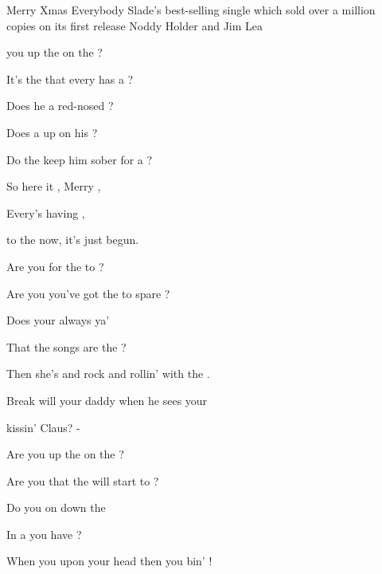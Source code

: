 \begin{SBSong}{Merry Xmas Everybody}
    {Slade's best-selling single which sold over a million copies on its first release}
    {Noddy Holder and Jim Lea}
  \begin{SBVerse}
	 you  up the  on the ?  
	
	It's the  that every  has a ?  
	
	Does he  a red-nosed ?
	
	Does a  up on his ?
	
	Do the  keep him sober for a ?  
  \end{SBVerse}
  
  \begin{SBChorus}
	So here it , Merry ,
	
	Every's having ,
	
	 to the  now, it's  just begun.   
  \end{SBChorus}
  \begin{SBVerse}
	Are you  for the  to ?
	
	Are you  you've got the  to spare ?
	
	Does your  always  ya'
	
	That the  songs are the ?
	
	Then she's  and rock and rollin' with the .  
  \end{SBVerse}
  \begin{SBBracket}{Break}
	 will your daddy  when he sees your
	
	 kissin'  Claus? - 
  \end{SBBracket}
  \begin{SBVerse}
	Are you  up the  on the ?
	
	Are you  that the  will start to ?
	
	Do you  on down the 
	
	In a  you have ?
	
	When you  upon your head then you bin' !   
  \end{SBVerse}
\end{SBSong}
